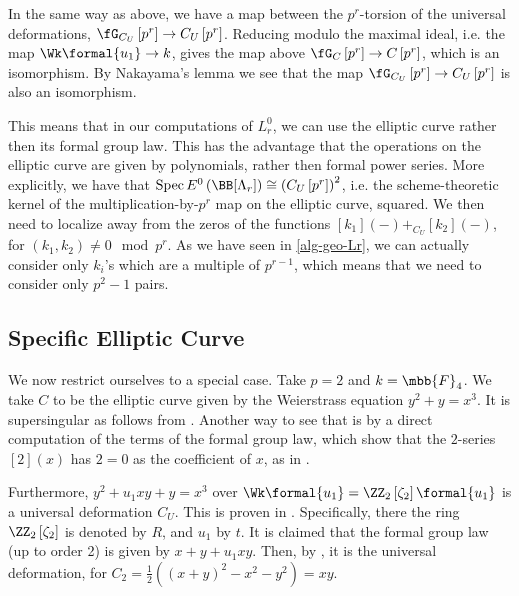 In the same way as above, we have a map between the $p^r$-torsion of the universal deformations, $\fG_{C_U}\left[p^r\right] \to C_U\left[p^r\right]$.
Reducing modulo the maximal ideal, i.e. the map $\Wk\formal{u_1} \to k$, gives the map above $\fG_C\left[p^r\right] \to C\left[p^r\right]$, which is an isomorphism.
By Nakayama's lemma we see that the map $\fG_{C_U}\left[p^r\right] \to C_U\left[p^r\right]$ is also an isomorphism.

This means that in our computations of $L_r^0$, we can use the elliptic curve rather then its formal group law.
This has the advantage that the operations on the elliptic curve are given by polynomials, rather then formal power series.
More explicitly, we have that $\spec E^0\left(\BB[\Lambda_r]\right) \cong \left(C_U\left[p^r\right]\right)^2$, i.e. the scheme-theoretic kernel of the multiplication-by-$p^r$ map on the elliptic curve, squared.
We then need to localize away from the zeros of the functions $[k_1]\left(-\right) +_{C_U} [k_2]\left(-\right)$, for $\left(k_1, k_2\right) \neq 0 \mod p^r$.
As we have seen in \ref{alg-geo-Lr}, we can actually consider only $k_i$'s which are a multiple of $p^{r-1}$, which means that we need to consider only $p^2-1$ pairs.



\subsection{Specific Elliptic Curve}

We now restrict ourselves to a special case.
Take $p = 2$ and $k = \mbb{F}_4$.
We take $C$ to be the elliptic curve given by the Weierstrass equation $y^2 + y = x^3$.
It is supersingular as follows from \cite[exercise V.5.7 combined with proposition A.1.1.c]{Sil}.
Another way to see that is by a direct computation of the terms of the formal group law, which show that the $2$-series $\left[2\right]\left(x\right)$ has $2=0$ as the coefficient of $x$, as in \cite[6.1.4]{Bea}.

Furthermore, $y^2 + u_1 xy + y = x^3$ over $\Wk\formal{u_1} = \ZZ_2\left[\zeta_2\right]\formal{u_1}$ is a universal deformation $C_U$.
This is proven in \cite[3.5]{LT}.
Specifically, there the ring $\ZZ_2\left[\zeta_2\right]$ is denoted by $R$, and $u_1$ by $t$.
It is claimed that the formal group law (up to order 2) is given by $x+y+u_1 xy$.
Then, by \cite[1.1]{LT}, it is the universal deformation, for $C_2 = \frac{1}{2}\left(\left(x+y\right)^2-x^2-y^2\right)=xy$.
